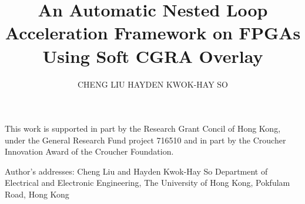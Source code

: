 \documentclass[acmtrets]{acmsmall}
\begin{document}
\title{An Automatic Nested Loop Acceleration Framework on FPGAs Using Soft CGRA Overlay}
\author{CHENG LIU
HAYDEN KWOK-HAY SO
}

\begin{abstract}
    
\end{abstract}



\begin{bottomstuff}
This work is supported in part by the Research Grant Concil of Hong
Kong, under the General Research Fund project 716510 and in part by
the Croucher Innovation Award of the Croucher Foundation.

Author's addresses: Cheng Liu and Hayden Kwok-Hay So
Department of Electrical and Electronic Engineering, The University of
Hong Kong, Pokfulam Road, Hong Kong

\end{bottomstuff}

\maketitle










{\small}

\end{document}

